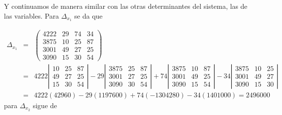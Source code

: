 \documentclass[12pt, landscape]{article}
\begin{document}
	Y continuamos de manera similar con las otras determinantes del sistema, las de las variables. Para $\Delta_{x_1}$ se da que

	\begin{eqnarray*}
		\Delta_{x_1} &=& \left(\begin{array}{rrrr}
							4222 & 29 & 74 & 34 \\
							3875 & 10 & 25 & 87 \\
							3001 & 49 & 27 & 25 \\
							3090 & 15 & 30 & 54
						\end{array}\right) \\
					&=& 4222 \left|\begin{array}{rrr}
						10 & 25 & 87 \\
						49 & 27 & 25 \\
						15 & 30 & 54
					\end{array}\right| 
					-29 \left|\begin{array}{rrr}
						3875 & 25 & 87 \\
						3001 & 27 & 25 \\
						3090 & 30 & 54
					\end{array}\right| 
					+74 \left|\begin{array}{rrr}
						3875 & 10 & 87 \\
						3001 & 49 & 25 \\
						3090 & 15 & 54
					\end{array}\right| 
					-34 \left|\begin{array}{rrr}
						3875 & 10 & 25 \\
						3001 & 49 & 27 \\
						3090 & 15 & 30
						\end{array}\right| \\
					&=&  4222(42960) -29(1197600) +74(-1304280) -34(1401000) = 2496000
	\end{eqnarray*}
	para $\Delta_{x_2}$ sigue de 
\end{document}
